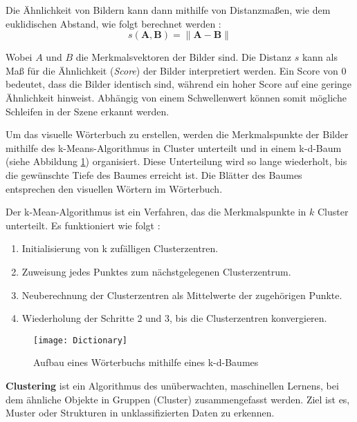 Die Ähnlichkeit von Bildern kann dann mithilfe von Distanzmaßen, wie dem euklidischen Abstand, wie folgt berechnet werden \cite{gao2021vSLAM}:
\begin{equation}
    s(\mathbf{A}, \mathbf{B}) = \|\mathbf{A} - \mathbf{B}\|
\end{equation}

Wobei \( A \) und \( B \) die Merkmalsvektoren der Bilder sind. Die Distanz \( s \) kann als Maß für die Ähnlichkeit (\emph{Score}) der Bilder interpretiert werden. Ein Score von 0 bedeutet, dass die Bilder identisch sind, während ein hoher Score auf eine geringe Ähnlichkeit hinweist. Abhängig von einem Schwellenwert können somit mögliche Schleifen in der Szene erkannt werden. \cite{gao2021vSLAM}

Um das visuelle Wörterbuch zu erstellen, werden die Merkmalspunkte der Bilder mithilfe des k-Means-Algorithmus in Cluster unterteilt und in einem k-d-Baum (siehe Abbildung \ref{fig:Dictionary}) organisiert. Diese Unterteilung wird so lange wiederholt, bis die gewünschte Tiefe des Baumes erreicht ist. Die Blätter des Baumes entsprechen den visuellen Wörtern im Wörterbuch. \cite{gao2021vSLAM}

Der k-Mean-Algorithmus ist ein Verfahren, das die Merkmalspunkte in \( k \) Cluster unterteilt. Es funktioniert wie folgt \cite{teynor2024ml}:

\begin{enumerate}
    \item Initialisierung von k zufälligen Clusterzentren.
    \item Zuweisung jedes Punktes zum nächstgelegenen Clusterzentrum.
    \item Neuberechnung der Clusterzentren als Mittelwerte der zugehörigen Punkte.
    \item Wiederholung der Schritte 2 und 3, bis die Clusterzentren konvergieren.
\end{enumerate}

\begin{figure}[h]
    \centering
    \texttt{[image: Dictionary]}
    \caption{Aufbau eines Wörterbuchs mithilfe eines k-d-Baumes \cite{gao2021vSLAM}\label{fig:Dictionary}}\par
\end{figure}

\begin{tcolorbox}[colback=THAi-Blue!20!white, colframe=THAi-Blue]
    \textbf{Clustering} ist ein Algorithmus des unüberwachten, maschinellen Lernens, bei dem ähnliche Objekte in Gruppen (Cluster) zusammengefasst werden. Ziel ist es, Muster oder Strukturen in unklassifizierten Daten zu erkennen. \cite{wikipedia2025clusteranalyse}
\end{tcolorbox}

